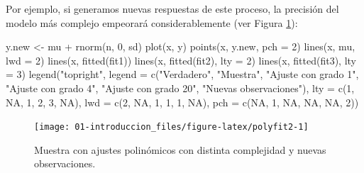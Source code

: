 \documentclass[
]{book}
\newenvironment{Shaded}{\begin{snugshade}}{\end{snugshade}}
\newcommand{\AttributeTok}[1]{\textcolor[rgb]{0.77,0.63,0.00}{#1}}
\newcommand{\ConstantTok}[1]{\textcolor[rgb]{0.00,0.00,0.00}{#1}}
\newcommand{\DecValTok}[1]{\textcolor[rgb]{0.00,0.00,0.81}{#1}}
\newcommand{\FunctionTok}[1]{\textcolor[rgb]{0.00,0.00,0.00}{#1}}
\newcommand{\NormalTok}[1]{#1}
\newcommand{\OtherTok}[1]{\textcolor[rgb]{0.56,0.35,0.01}{#1}}
\newcommand{\SpecialCharTok}[1]{\textcolor[rgb]{0.00,0.00,0.00}{#1}}
\newcommand{\StringTok}[1]{\textcolor[rgb]{0.31,0.60,0.02}{#1}}
\theoremstyle{break}
\theoremstyle{nonumberplain}
\begin{document}
Por ejemplo, si generamos nuevas respuestas de este proceso, la precisión del modelo más complejo empeorará considerablemente (ver Figura \ref{fig:polyfit2}):

\begin{Shaded}
\begin{Highlighting}[]
\NormalTok{y.new }\OtherTok{\textless{}{-}}\NormalTok{ mu }\SpecialCharTok{+} \FunctionTok{rnorm}\NormalTok{(n, }\DecValTok{0}\NormalTok{, sd)}
\FunctionTok{plot}\NormalTok{(x, y) }
\FunctionTok{points}\NormalTok{(x, y.new, }\AttributeTok{pch =} \DecValTok{2}\NormalTok{)}
\FunctionTok{lines}\NormalTok{(x, mu, }\AttributeTok{lwd =} \DecValTok{2}\NormalTok{)}
\FunctionTok{lines}\NormalTok{(x, }\FunctionTok{fitted}\NormalTok{(fit1))}
\FunctionTok{lines}\NormalTok{(x, }\FunctionTok{fitted}\NormalTok{(fit2), }\AttributeTok{lty =} \DecValTok{2}\NormalTok{)}
\FunctionTok{lines}\NormalTok{(x, }\FunctionTok{fitted}\NormalTok{(fit3), }\AttributeTok{lty =} \DecValTok{3}\NormalTok{)}
\FunctionTok{legend}\NormalTok{(}\StringTok{"topright"}\NormalTok{, }\AttributeTok{legend =} \FunctionTok{c}\NormalTok{(}\StringTok{"Verdadero"}\NormalTok{, }\StringTok{"Muestra"}\NormalTok{, }\StringTok{"Ajuste con grado 1"}\NormalTok{, }
          \StringTok{"Ajuste con grado 4"}\NormalTok{, }\StringTok{"Ajuste con grado 20"}\NormalTok{, }\StringTok{"Nuevas observaciones"}\NormalTok{), }
       \AttributeTok{lty =} \FunctionTok{c}\NormalTok{(}\DecValTok{1}\NormalTok{, }\ConstantTok{NA}\NormalTok{, }\DecValTok{1}\NormalTok{, }\DecValTok{2}\NormalTok{, }\DecValTok{3}\NormalTok{, }\ConstantTok{NA}\NormalTok{), }\AttributeTok{lwd =} \FunctionTok{c}\NormalTok{(}\DecValTok{2}\NormalTok{, }\ConstantTok{NA}\NormalTok{, }\DecValTok{1}\NormalTok{, }\DecValTok{1}\NormalTok{, }\DecValTok{1}\NormalTok{, }\ConstantTok{NA}\NormalTok{), }
       \AttributeTok{pch =} \FunctionTok{c}\NormalTok{(}\ConstantTok{NA}\NormalTok{, }\DecValTok{1}\NormalTok{, }\ConstantTok{NA}\NormalTok{, }\ConstantTok{NA}\NormalTok{, }\ConstantTok{NA}\NormalTok{, }\DecValTok{2}\NormalTok{))}
\end{Highlighting}
\end{Shaded}

\begin{figure}[!htb]

{\centering \texttt{[image: 01-introduccion\_files/figure-latex/polyfit2-1]} 

}

\caption{Muestra con ajustes polinómicos con distinta complejidad y nuevas observaciones.}\label{fig:polyfit2}
\end{figure}
\end{document}
